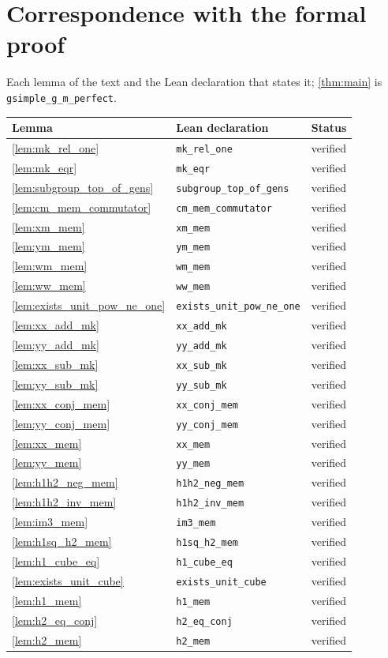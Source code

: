 \documentclass[11pt]{article}
\theoremstyle{definition}
\theoremstyle{remark}
\begin{document}
\appendix
\section{Correspondence with the formal proof}
Each lemma of the text and the Lean declaration that states it; \cref{thm:main} is \texttt{gsimple\_g\_m\_perfect}.

\begin{longtable}{@{}lll@{}}
\toprule
Lemma & Lean declaration & Status \\
\midrule
\endhead
\cref{lem:mk_rel_one} & \texttt{mk\_rel\_one} & verified \\
\cref{lem:mk_eqr} & \texttt{mk\_eqr} & verified \\
\cref{lem:subgroup_top_of_gens} & \texttt{subgroup\_top\_of\_gens} & verified \\
\cref{lem:cm_mem_commutator} & \texttt{cm\_mem\_commutator} & verified \\
\cref{lem:xm_mem} & \texttt{xm\_mem} & verified \\
\cref{lem:ym_mem} & \texttt{ym\_mem} & verified \\
\cref{lem:wm_mem} & \texttt{wm\_mem} & verified \\
\cref{lem:ww_mem} & \texttt{ww\_mem} & verified \\
\cref{lem:exists_unit_pow_ne_one} & \texttt{exists\_unit\_pow\_ne\_one} & verified \\
\cref{lem:xx_add_mk} & \texttt{xx\_add\_mk} & verified \\
\cref{lem:yy_add_mk} & \texttt{yy\_add\_mk} & verified \\
\cref{lem:xx_sub_mk} & \texttt{xx\_sub\_mk} & verified \\
\cref{lem:yy_sub_mk} & \texttt{yy\_sub\_mk} & verified \\
\cref{lem:xx_conj_mem} & \texttt{xx\_conj\_mem} & verified \\
\cref{lem:yy_conj_mem} & \texttt{yy\_conj\_mem} & verified \\
\cref{lem:xx_mem} & \texttt{xx\_mem} & verified \\
\cref{lem:yy_mem} & \texttt{yy\_mem} & verified \\
\cref{lem:h1h2_neg_mem} & \texttt{h1h2\_neg\_mem} & verified \\
\cref{lem:h1h2_inv_mem} & \texttt{h1h2\_inv\_mem} & verified \\
\cref{lem:im3_mem} & \texttt{im3\_mem} & verified \\
\cref{lem:h1sq_h2_mem} & \texttt{h1sq\_h2\_mem} & verified \\
\cref{lem:h1_cube_eq} & \texttt{h1\_cube\_eq} & verified \\
\cref{lem:exists_unit_cube} & \texttt{exists\_unit\_cube} & verified \\
\cref{lem:h1_mem} & \texttt{h1\_mem} & verified \\
\cref{lem:h2_eq_conj} & \texttt{h2\_eq\_conj} & verified \\
\cref{lem:h2_mem} & \texttt{h2\_mem} & verified \\
\bottomrule
\end{longtable}
\end{document}
